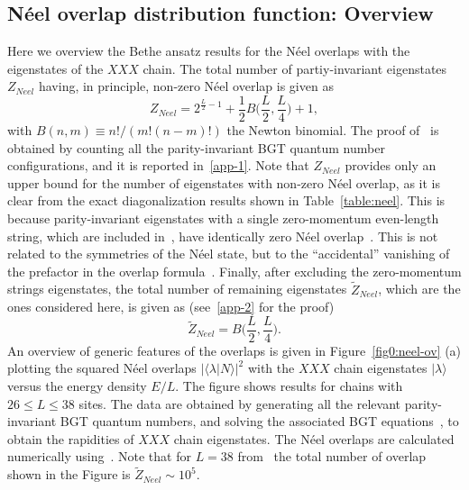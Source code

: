 \documentclass[11pt]{iopart}
\begin{document}
\subsection{N\'eel overlap distribution function: Overview}
\label{sec:5.1}

Here we overview the Bethe ansatz results for the N\'eel overlaps with the 
eigenstates of the $XXX$ chain. The total number of partiy-invariant 
eigenstates $Z_{Neel}$ having, in principle, non-zero N\'eel overlap is given 
as 
%
\begin{equation}
\label{zneel1}
Z_{Neel}=2^{\frac{L}{2}-1}+\frac{1}{2}B\Big(\frac{L}{2},\frac{L}{4}\Big)+1, 
\end{equation}
%
with $B(n,m)\equiv n!/(m!(n-m)!)$ the Newton binomial. The proof of~ 
is obtained by counting all the parity-invariant BGT quantum number configurations, 
and it is reported in~\ref{app-1}. Note that $Z_{Neel}$ provides only an upper 
bound for the number of eigenstates with non-zero N\'eel overlap, as it is clear 
from the exact diagonalization results shown in Table~\ref{table:neel}. This is 
because parity-invariant eigenstates with a single zero-momentum even-length 
string, which are included in~, have identically zero N\'eel 
overlap~\cite{brockmann-2014}. This is not related to the symmetries of the N\'eel 
state, but to the ``accidental'' vanishing of the prefactor in the overlap 
formula~. Finally, after excluding the zero-momentum strings 
eigenstates, the total number of remaining eigenstates $\widetilde Z_{Neel}$, 
which are the ones considered here, is given as (see~\ref{app-2} for the proof) 
%
\begin{equation}
\label{ztilde}
\widetilde Z_{Neel}=B\Big(\frac{L}{2},\frac{L}{4}\Big).
\end{equation}
%
An overview of generic features of the overlaps is given in Figure~\ref{fig0:neel-ov} 
(a) plotting the squared N\'eel overlaps $|\langle\lambda|N\rangle|^2$ with the $XXX$ 
chain eigenstates $|\lambda\rangle$ versus the energy density $E/L$. The figure shows 
results for chains with $26\le L\le 38$ sites. The data are obtained by generating all 
the relevant parity-invariant BGT quantum numbers, and solving the associated BGT 
equations~, to obtain the rapidities of $XXX$ chain eigenstates. The 
N\'eel overlaps are calculated numerically using~. Note that for $L=38$ 
from~ the total number of overlap shown in the Figure is $\widetilde Z_{Neel}
\sim 10^5$. 
\end{document}

